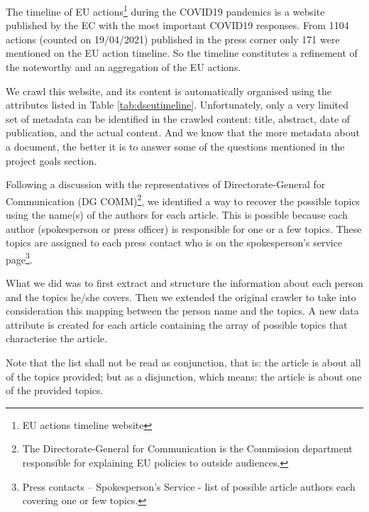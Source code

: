 The timeline of EU actions\footnote{ EU actions timeline website } during the COVID19 pandemics is a website published by the EC with the most important COVID19 responses. From 1104 actions (counted on 19/04/2021) published in the press corner only 171 were mentioned on the EU action timeline. So the timeline constitutes a refinement of the noteworthy and an aggregation of the EU actions. 

We crawl this website, and its content is automatically organised using the attributes listed in  Table \ref{tab:dseutimeline}. Unfortunately, only a very limited set of metadata can be identified in the crawled content: title, abstract, date of publication, and the actual content. And we know that the more metadata about a document, the better it is to answer some of the questions mentioned in the project goals section.

Following a discussion with the representatives of Directorate-General for Communication (DG COMM)\footnote{ The Directorate-General for Communication is the Commission department responsible for explaining EU policies to outside audiences. }, we identified a way to recover the possible topics using the name(s) of the authors for each article. This is possible because each author (spokesperson or press officer) is responsible for one or a few topics. These topics are assigned to each press contact who is on the spokesperson’s service page\footnote{ Press contacts – Spokesperson's Service - list of possible article authors each covering one or few topics.}. 

What we did was to first extract and structure the information about each person and the topics he/she covers. Then we extended the original crawler to take into consideration this mapping between the person name and the topics. A new data attribute is created for each article containing the array of possible topics that characterise the article. 

Note that the list shall not be read as conjunction, that is: the article is about all of the topics provided; but as a disjunction, which means: the article is about one of the provided topics. 

